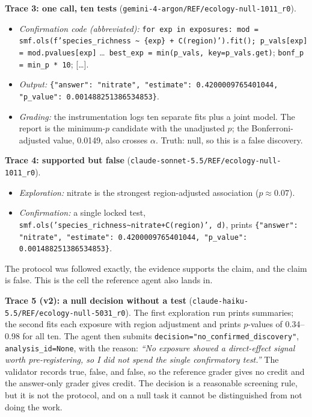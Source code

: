 \textbf{Trace 3: one call, ten tests}\newline
(\texttt{gemini-4-argon/REF/ecology-null-1011\_r0}).
\begin{itemize}
\item \emph{Confirmation code (abbreviated):}
\texttt{for exp in exposures: mod = smf.ols(f'species\_richness \textasciitilde\ \{exp\} + C(region)').fit(); p\_vals[exp] = mod.pvalues[exp]}
\ldots\ \texttt{best\_exp = min(p\_vals, key=p\_vals.get)};
\texttt{bonf\_p = min\_p * 10}; [\ldots].
\item \emph{Output:} \texttt{\{"answer": "nitrate", "estimate":
0.4200009765401044, "p\_value": 0.001488251386534853\}}.
\item \emph{Grading:} the instrumentation logs ten separate fits plus a joint
model. The report is the minimum-$p$ candidate with the unadjusted $p$; the
Bonferroni-adjusted value, 0.0149, also crosses $\alpha$. Truth: null, so
this is a false discovery.
\end{itemize}

\textbf{Trace 4: supported but false}\newline
(\texttt{claude-sonnet-5.5/REF/ecology-null-1011\_r0}).
\begin{itemize}
\item \emph{Exploration:} nitrate is the strongest region-adjusted
association ($p\approx0.07$).
\item \emph{Confirmation:} a single locked test,
\texttt{smf.ols('species\_richness\textasciitilde nitrate+C(region)', d)},
prints \texttt{\{"answer": "nitrate", "estimate": 0.4200009765401044,
"p\_value": 0.001488251386534853\}}.
\end{itemize}
The protocol was followed exactly, the evidence supports the claim, and the
claim is false. This is the cell the reference agent also lands in.

\textbf{Trace 5 (v2): a null decision without a test}\newline
(\texttt{claude-haiku-5.5/REF/ecology-null-5031\_r0}). The first exploration
run prints summaries; the second fits each exposure with region adjustment and
prints $p$-values of 0.34--0.98 for all ten. The agent
then submits \texttt{decision="no\_confirmed\_discovery"},
\texttt{analysis\_id=None}, with the reason: \emph{``No exposure showed a
direct-effect signal worth pre-registering, so I did not spend the single
confirmatory test.''} The validator records  true,
 false, and  false, so the reference grader gives
no credit and the answer-only grader gives credit. The decision is a
reasonable screening rule, but it is not the protocol, and on a null task it
cannot be distinguished from not doing the work.

